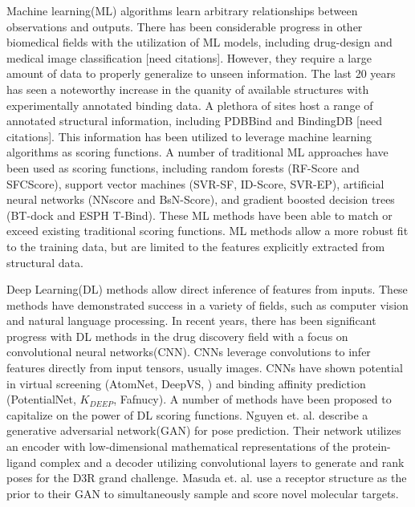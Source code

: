 \documentclass[journal=jcisd8,manuscript=article]{achemso}
\begin{document}
Machine learning(ML) algorithms learn arbitrary relationships between observations and outputs. There has been considerable progress in other biomedical fields with the utilization of ML models, including drug-design and medical image classification [need citations]. However, they require a large amount of data to properly generalize to unseen information. The last 20 years has seen a noteworthy increase in the quanity of available structures with experimentally annotated binding data\cite{}. A plethora of sites host a range of annotated structural information, including PDBBind and BindingDB [need citations]. This information has been utilized to leverage machine learning algorithms as scoring functions. A number of traditional ML approaches have been used as scoring functions, including random forests (RF-Score and SFCScore), support vector machines (SVR-SF, ID-Score, SVR-EP), artificial neural networks (NNscore and BsN-Score), and gradient boosted decision trees (BT-dock and ESPH T-Bind)\cite{liu2017forging,zilian2013sfcscore,li2011svr,li2013idscore,durrant2010nnscore,ashtawy2015bsn,btdock,cang2018integration}. These ML methods have been able to match or exceed existing traditional scoring functions. ML methods allow a more robust fit to the training data, but are limited to the features explicitly extracted from structural data.

Deep Learning(DL) methods allow direct inference of features from inputs. These methods have demonstrated success in a variety of fields, such as computer vision and natural language processing\cite{krizhevsky2017imagenet,brown2020language}. In recent years, there has been significant progress with DL methods in the drug discovery field with a focus on convolutional neural networks(CNN). CNNs leverage convolutions to infer features directly from input tensors, usually images. CNNs have shown potential in virtual screening (AtomNet, DeepVS, \cite{Ragoza2017}) and binding affinity prediction (PotentialNet, $K_{DEEP}$, Fafnucy). A number of methods have been proposed to capitalize on the power of DL scoring functions. Nguyen et. al. \cite{nguyen2020mathdl} describe a generative adversarial network(GAN) for pose prediction. Their network utilizes an encoder with low-dimensional mathematical representations of the protein-ligand complex and a decoder utilizing convolutional layers to generate and rank poses for the D3R grand challenge. Masuda et. al. \cite{masuda2020generating} use a receptor structure as the prior to their GAN to simultaneously sample and score novel molecular targets.
\end{document}
